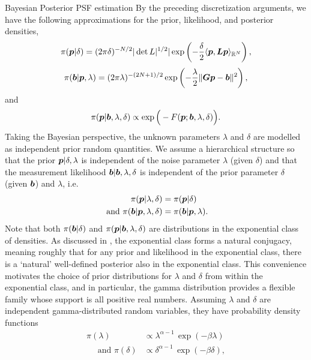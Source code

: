\begin{chapter}{Bayesian Posterior PSF estimation}
By the preceding discretization arguments, we have the following approximations for the prior, likelihood, and posterior densities,
\begin{equation}\label{eq:discretePrior}
  \pi(\mbox{\boldmath$p$}| \delta) =(2\pi\delta )^{-N/2} |\det L|^{1/2}|\exp\left(-\frac \delta2 \langle \mbox{\boldmath$p$},\mbox{\boldmath$L$}\mbox{\boldmath$p$}\rangle_{\mathbb R^N}\right),
\end{equation}
\begin{equation} \label{eq:discreteLiklihood}
  \pi(\mbox{\boldmath$b$} |\mbox{\boldmath$p$},\lambda) = (2\pi \lambda )^{-(2N+1)/2} \exp\left(-\frac \lambda2 \|\mbox{\boldmath$G$}\mbox{\boldmath$p$}-\mbox{\boldmath$b$}\|^2\right),
\end{equation}
and
\begin{equation}\label{eq:discretePosterior}
  \pi(\mbox{\boldmath$p$} | \mbox{\boldmath$b$},\lambda, \delta) \propto \exp\Big(-F(\mbox{\boldmath$p$};\mbox{\boldmath$b$},\lambda,\delta) \Big).
\end{equation}
Taking the Bayesian perspective, the unknown parameters $\lambda$ and $\delta$ are modelled as independent prior random quantities.
We assume a hierarchical structure so that the prior $\mbox{\boldmath$p$}|\delta,\lambda$ is independent of the noise parameter $\lambda$ (given $\delta$) and that the measurement likelihood $\mbox{\boldmath$b$}|\mbox{\boldmath$b$},\lambda,\delta$ is independent of the prior parameter $\delta$ (given $\mbox{\boldmath$b$}$) and $\lambda$, i.e.
\begin{align}
  \pi(\mbox{\boldmath$p$}|\lambda,\delta) &= \pi(\mbox{\boldmath$p$}|\delta) \\
\text{ and } \pi(\mbox{\boldmath$b$}|\mbox{\boldmath$p$},\lambda,\delta) &= \pi(\mbox{\boldmath$b$}|\mbox{\boldmath$p$},\lambda).
\end{align}
Note that both $\pi(\mbox{\boldmath$b$}|\delta)$ and $\pi(\mbox{\boldmath$p$}|\mbox{\boldmath$b$},\lambda,\delta)$ are distributions in the exponential class of densities.
As discussed in \citep{gelman2014bayesian}, the exponential class forms a natural conjugacy, meaning roughly that for any prior and likelihood in the exponential class, there is a `natural' well-defined posterior also in the exponential class.
This convenience motivates the choice of prior distributions for $\lambda$ and $\delta$ from within the exponential class, and in particular, the gamma distribution provides a flexible family whose support is all positive real numbers.
Assuming $\lambda$ and $\delta$ are independent gamma-distributed random variables, they have probability density functions 
\begin{align} 
                \pi(\lambda) &\propto \lambda^{\alpha -1}\,\exp(-\beta\lambda)\label{eq:deltaPrior}\\
\quad\text{ and }\pi(\delta) &\propto \delta^{\alpha-1}\,\exp(-\beta\delta), \label{eq:lambdaPrior}

\end{align}
\end{chapter}
